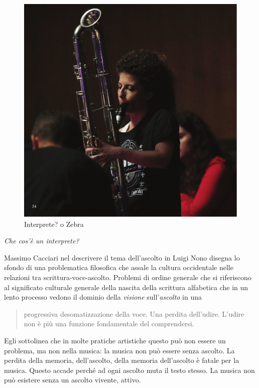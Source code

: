 \documentclass{gs-adonis}
\begin{document}
\begin{figure}[t]
  \centering
  \includegraphics[width=\linewidth]{images/panthera.pdf}
  \captionsetup{width=.81\linewidth}
  \caption{Interprete? o Zebra}
  \label{alice}
\end{figure}

\emph{Che cos'è un interprete?}

Massimo Cacciari nel descrivere il tema dell'ascolto in Luigi Nono
\cite{Cacciari1995} disegna lo sfondo di una problematica filosofica che assale
la cultura occidentale nelle relazioni tra scrittura-voce-ascolto. Problemi di
ordine generale che si riferiscono al significato culturale generale della
nascita della scrittura alfabetica che in un lento processo vedono il dominio
della \emph{visione} sull'\emph{ascolto} in una

\begin{quote}
  progressiva desomatizzazione della voce. Una perdita dell'udire. L'udire
  non è più una funzione fondamentale del comprendersi. \cite{Cacciari1995}
\end{quote}

Egli sottolinea che in molte pratiche artistiche questo può non essere un 
problema, ma non nella musica: la musica non può essere senza ascolto. 
La perdita della memoria, dell'ascolto, della memoria dell'ascolto è fatale 
per la musica. Questo accade perché ad ogni ascolto muta il testo stesso. 
La musica non può esistere senza un ascolto vivente, attivo.
\end{document}
